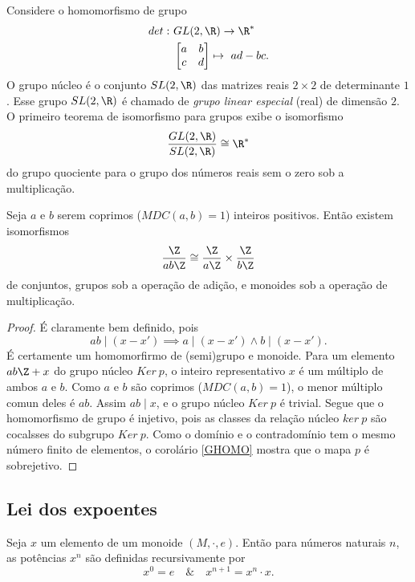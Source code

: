       \begin{exmp}
         Considere o homomorfismo de grupo  
         \begin{alignat}{2}
            det:\ &GL(2,\R) \to \R^{*}\nonumber\\
            &\begin{bmatrix}
               a & b\\
               c & d
            \end{bmatrix} \mapsto\ ad - bc.
            \nonumber
         \end{alignat}
         O grupo núcleo é o conjunto $SL(2,\R)$ das matrizes reais $2 \times 2$ de determinante $1$. Esse grupo $SL(2,\R)$ é chamado de \emph{grupo linear especial} (real) de dimensão $2$. O primeiro teorema de isomorfismo para grupos exibe o isomorfismo
         $$\dfrac{GL(2,\R)}{SL(2,\R)} \cong \R^{*}$$ do grupo quociente para o grupo dos números reais sem o zero sob a multiplicação.
      \end{exmp}
      \begin{theorem}
         Seja $a$ e $b$ serem coprimos ($MDC(a,b) = 1$) inteiros positivos. Então existem isomorfismos $$\dfrac{\Z}{ab\Z} \cong \dfrac{\Z}{a\Z} \times \dfrac{\Z}{b\Z}$$ de conjuntos, grupos sob a operação de adição, e monoides sob a operação de multiplicação.
         \begin{proof}
            É claramente bem definido, pois $$ab \mid (x - x') \implies a \mid (x - x') \wedge b \mid (x - x').$$ É certamente um homomorfirmo de (semi)grupo e monoide. Para um elemento $ab\Z + x$ do grupo núcleo $Ker\ p$, o inteiro representativo $x$ é um múltiplo de ambos $a$ e $b$. Como $a$ e $b$ são coprimos ($MDC(a,b) = 1$), o menor múltiplo comun deles é $ab$. Assim $ab \mid x$, e o grupo núcleo $Ker\ p$ é trivial. Segue que o homomorfismo de grupo é injetivo, pois as classes da relação núcleo $ker\ p$ são cocalsses do subgrupo $Ker\ p$. Como o domínio e o contradomínio tem o mesmo número finito de elementos, o corolário \ref{GHOMO} mostra que o mapa $p$ é sobrejetivo.
         \end{proof}
      \end{theorem}

   \subsection{Lei dos expoentes}
      Seja $x$ um elemento de um monoide $(M, \cdot, e)$. Então para números naturais $n$, as potências $x^n$ são definidas recursivamente por
      \begin{equation}\label{RECEXPO}
         x^{0} = e\quad \&\quad x^{n+1}=x^{n} \cdot x.  
      \end{equation}

